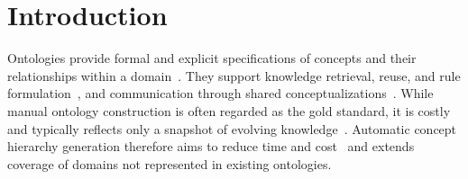 \section{Introduction}
\label{sec:introduction}


Ontologies provide formal and explicit specifications of concepts and their relationships within a domain~\cite{studer:98}.
They support knowledge retrieval, reuse, and rule formulation~\cite{cimiano_learning_2005,yang2012personalized}, and communication through shared conceptualizations~\cite{studer:98,storey:98}. %
While manual ontology construction is often regarded as the gold standard, it is costly and typically reflects only a snapshot of evolving knowledge~\cite{li2018unsupervised}.
Automatic concept hierarchy generation therefore aims to reduce time and cost~\cite{Aznag2014LeveragingFC,risch2020hierarchical} and extends coverage of domains not represented in existing ontologies.


